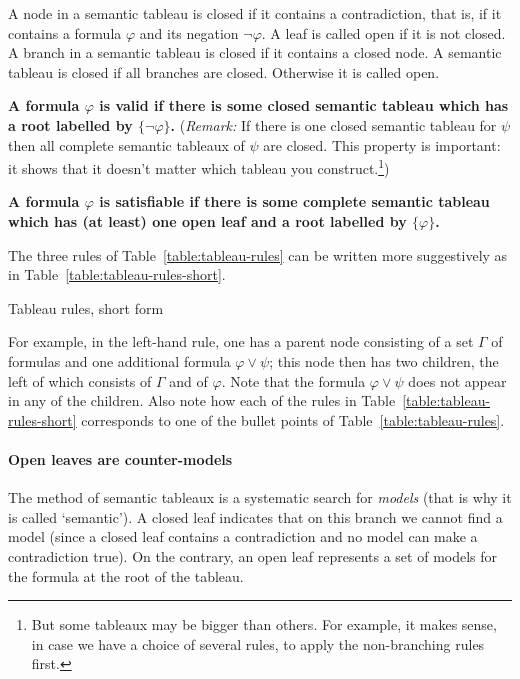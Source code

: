 \documentclass[11pt]{article}
\renewcommand{\phi}{\varphi}
\newcommand{\et}{\ensuremath{\wedge}} %
\newcommand{\ou}{\ensuremath{\vee}} %
\newcommand{\rules}[2]{\mbox{$\frac%
                      {\mbox{\normalsize \rule[-5pt]{0pt}{14pt} $#1$}} 
                      {\mbox{\normalsize \rule[0pt]{0pt}{10pt}$#2$}}$}}
\newcounter{prop}
\begin{document}
\begin{definition}
A node in a semantic tableau is closed if it contains a contradiction,
that is, if it contains a formula $\phi$ and its negation
$\neg\phi$. A leaf is called open if it is not closed. A branch in a
semantic tableau is closed if it contains a closed node. A semantic
tableau is closed if all branches are closed. Otherwise it is called open.
\end{definition} 

\medskip\noindent \textbf{A formula $\phi$ is valid if there is some closed semantic tableau
which has a root labelled by $\{\neg\phi\}$.}
(\textit{Remark: } If there is one closed semantic tableau for $\psi$
then all complete semantic tableaux of $\psi$ are closed. This
property is important: it shows that it doesn't matter which tableau
you construct.\footnote{But some tableaux may be bigger than others.
  For example, it makes sense, in case we have a choice of several
  rules, to apply the non-branching rules first.}) 

\medskip\noindent \textbf{A formula $\phi$ is satisfiable if there is some complete semantic tableau
which has (at least) one open leaf and  a root labelled by
$\{\phi\}$.}


\medskip The three rules of Table~\ref{table:tableau-rules} can be written more suggestively as in
Table~\ref{table:tableau-rules-short}.
\begin{table}
\fbox{\parbox{\textwidth}{
\[
\rules{\Gamma,\phi\ou\psi }{\Gamma,\phi \quad\quad \Gamma,\psi}
\quad\quad\quad
\rules{\Gamma,\phi\et\psi}{\Gamma,\phi,\psi}
\quad\quad\quad
\rules{\Gamma,\neg\neg\phi}{\Gamma,\phi}
\]
}}
\caption{Tableau rules, short form}\label{table:tableau-rules-short}
\end{table}
For example, in the left-hand rule, one has a parent node consisting
of a set $\Gamma$ of formulas and one additional formula
$\phi\ou\psi$; this node then has two children, the left of which
consists of $\Gamma$ and of $\phi$. Note that the formula
$\phi\ou\psi$ does not appear in any of the children. Also note how
each of the rules in Table~\ref{table:tableau-rules-short} corresponds
to one of the bullet points of Table~\ref{table:tableau-rules}.



\paragraph{Open leaves are counter-models } The method of semantic
tableaux is a systematic search for \emph{models} (that is why it is
called `semantic'). A closed leaf indicates that on this branch we
cannot find a model (since a closed leaf contains a contradiction and
no model can make a contradiction true). On the contrary, an open leaf
represents a set of models for the formula at the root of the tableau.
\end{document}
